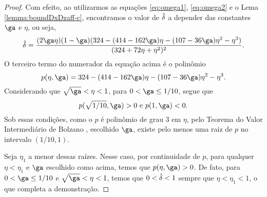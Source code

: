 \begin{proof}
	Com efeito, ao utilizarmos as equações \eqref{eq:omega1}, \eqref{eq:omega2} e o Lema \ref{lemma:boundDxDzaff-c}, encontramos o valor de $\hat{\delta}$ a depender das constantes $\ga$ e $\eta$, ou seja, 
	\begin{equation}
		\label{eq:nextdel-full}
		\nextdel = \frac{(2\ga\eta)(1-\ga)(324 -	(414 - 162\ga)\eta - (107 - 36\ga)\eta^{2} -  \eta^{3})}{(324 + 72\eta + \eta^{2})^{2}}.
	\end{equation}
	O terceiro termo do numerador da equação acima é o polinômio 
	\[
		p(\eta,\ga) =   324 -	(414 - 162\ga)\eta - (107 - 36\ga)\eta^{2} -  \eta^{3}. 
	\]
	Considerando que  $\sqrt{\ga}<\eta<1$, para $0 < \ga \leq 1/10$, segue que
	\[p(\sqrt{1/10},\ga) >0 \text{ e  } p(1,\ga) <0.\]
	Sob essas condições, como o $p$ é polinômio de grau 3 em $\eta$, pelo Teorema do Valor Intermediário de Bolzano \cite[Teorema 5.3.7]{Bartle:2011tr}, escolhido $\ga$, existe pelo menos uma  raiz  de $p$ no intervalo $(1/10,1)$. 

	Seja $\eta_{1}$ a menor dessas raízes. Nesse caso, por continuidade de $p$, para qualquer $\eta  < \eta_{1}$ e $\ga$ escolhido como acima, temos que  $p(\eta,\ga) >0$.  De fato,  para $0 < \ga \leq 1/10$ e  $\sqrt{\ga}<\eta<1$, temos que  $0<\hat{\delta}<1$  sempre que $\eta < \eta_{1} < 1$, o que completa a demonstração.
\end{proof}




	

